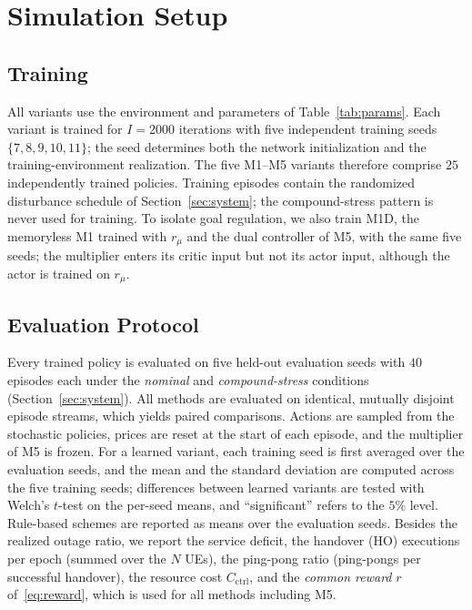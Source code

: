 \documentclass[journal]{IEEEtran}
\begin{document}
\section{Simulation Setup}
\label{sec:setup}

\subsection{Training}
All variants use the environment and parameters of Table~\ref{tab:params}.
Each variant is trained for $I=2000$ iterations with five independent
training seeds $\{7,8,9,10,11\}$; the seed determines both the network
initialization and the training-environment realization. The five M1--M5
variants therefore comprise $25$ independently trained policies. Training
episodes contain the randomized disturbance schedule of
Section~\ref{sec:system}; the compound-stress pattern is never used for
training. To isolate goal regulation, we also train M1D, the memoryless M1
trained with $r_\mu$ and the dual controller of M5, with the same five seeds;
the multiplier enters its critic input but not its actor input, although the
actor is trained on $r_\mu$.

\subsection{Evaluation Protocol}
Every trained policy is evaluated on five held-out evaluation seeds with $40$
episodes each under the \emph{nominal} and \emph{compound-stress} conditions
(Section~\ref{sec:system}). All methods are evaluated on identical,
mutually disjoint episode streams, which yields paired comparisons. Actions
are sampled from the stochastic policies, prices are reset at the start of
each episode, and the multiplier of M5 is frozen. For a learned variant, each
training seed is first averaged over the evaluation seeds, and the mean and
the standard deviation are computed across the five training seeds;
differences between learned variants are tested with Welch's $t$-test on the
per-seed means, and ``significant'' refers to the $5\%$ level. Rule-based
schemes are reported as means over the evaluation seeds. Besides the realized
outage ratio, we report the service deficit, the handover (HO) executions per epoch
(summed over the $N$ UEs), the ping-pong ratio (ping-pongs per successful
handover), the resource cost $C_{\mathrm{ctrl}}$, and the \emph{common reward}
$r$ of~\eqref{eq:reward}, which is used for all methods including M5.
\end{document}
